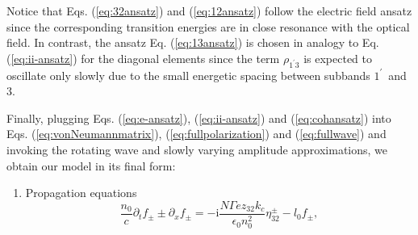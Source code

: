 \documentclass[10pt,letterpaper]{article}%
\begin{document}
Notice that Eqs. (\ref{eq:32ansatz}) and (\ref{eq:12ansatz}) follow the
electric field ansatz since the corresponding transition energies are in close
resonance with the optical field. In contrast, the ansatz Eq.
(\ref{eq:13ansatz}) is chosen in analogy to Eq. (\ref{eq:ii-ansatz}) for the
diagonal elements since the term $\rho_{1^{\prime}3}$ is expected to oscillate
only slowly due to the small energetic spacing between subbands $1^{\prime}%
$\ and $3$.

Finally, plugging Eqs. (\ref{eq:e-ansatz}), (\ref{eq:ii-ansatz}) and
(\ref{eq:cohansatz}) into Eqs. (\ref{eq:vonNeumannmatrix}),
(\ref{eq:fullpolarization}) and (\ref{eq:fullwave}) and invoking the rotating
wave and slowly varying amplitude approximations, we obtain our model in its
final form:

\begin{enumerate}
	\item { Propagation equations
		\begin{equation}
		\frac{n_{0}}{c}\partial_{t}f_{\pm}\pm\partial_{x}f_{\pm}=-\mathrm{i}%
		\frac{N\Gamma ez_{32}k_{c}}{\epsilon_{0}n_{0}^{2}}\eta_{32}^{\pm}-l_{0}f_{\pm
		}, \label{eq:rtwave}%
		\end{equation}
	}
	

\end{enumerate}
\end{document}
